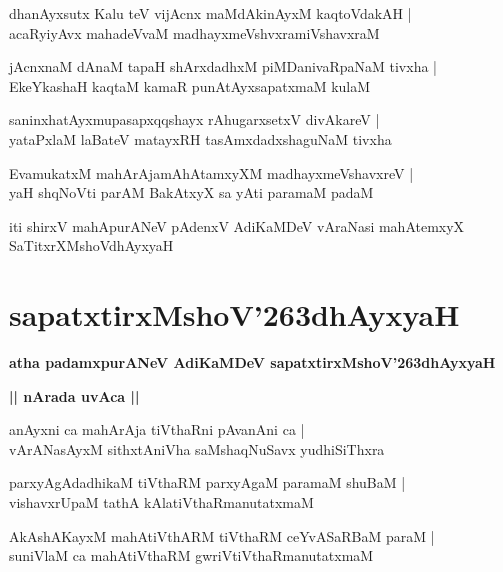 \documentclass[twoside,12pt,openright]{book}
\def\S{\char'263}
\newcounter{shloka}[chapter]
\def\uvaca#1{\centerline{{\large\textbf{#1}}}}
\begin{document}
\begin{shloka}
dhanAyxsutx Kalu teV vijAcnx maMdAkinAyxM kaqtoVdakAH |\\
acaRyiyAvx mahadeVvaM madhayxmeVshvxramiVshavxraM 
\end{shloka}

\begin{shloka}
jAcnxnaM dAnaM tapaH shArxdadhxM piMDanivaRpaNaM tivxha |\\
EkeYkashaH kaqtaM kamaR punAtAyxsapatxmaM kulaM 
\end{shloka}

\begin{shloka}
saninxhatAyxmupasapxqqshayx rAhugarxsetxV divAkareV |\\
yataPxlaM laBateV matayxRH tasAmxdadxshaguNaM tivxha 
\end{shloka}

\begin{shloka}
EvamukatxM mahArAjamAhAtamxyXM  madhayxmeVshavxreV |\\
yaH shqNoVti parAM BakAtxyX sa yAti paramaM padaM 
\end{shloka}

\begin{center}
iti shirxV  mahApurANeV pAdenxV  AdiKaMDeV vAraNasi mahAtemxyX SaTitxrXMshoVdhAyxyaH
\end{center}

\chapter{sapatxtirxMshoV\S dhAyxyaH}

\begin{center}
{\LARGE\bfseries atha padamxpurANeV AdiKaMDeV sapatxtirxMshoV\S dhAyxyaH}
\end{center}

\uvaca{ || nArada uvAca || }

\begin{shloka}
anAyxni ca mahArAja tiVthaRni pAvanAni ca |\\
vArANasAyxM sithxtAniVha saMshaqNuSavx yudhiSiThxra 
\end{shloka}

\begin{shloka}
parxyAgAdadhikaM tiVthaRM parxyAgaM paramaM shuBaM |\\
vishavxrUpaM tathA kAlatiVthaRmanutatxmaM 
\end{shloka}

\begin{shloka}
AkAshAKayxM mahAtiVthARM tiVthaRM ceYvASaRBaM paraM |\\
suniVlaM ca mahAtiVthaRM gwriVtiVthaRmanutatxmaM 
\end{shloka}
\end{document}
